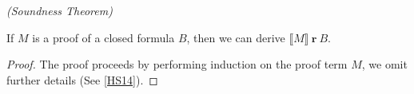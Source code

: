 \begin{mytheorem}
\emph{(Soundness Theorem)}

If $M$ is a proof of a closed formula $B$, then we can derive  $ \llbracket M \rrbracket \ \textbf{r} \ B$.

\begin{proof}

The proof proceeds by performing induction on the proof term $M$, we omit further details (See \ref{HS14}).

\begin{comment}
\begin{description}

\item[Case] $\lambda u^A M^B$ We must derive $$\llbracket \lambda u^A M^B
  \rrbracket \textbf{r} B$$
   \begin{description}
     \item[Subcase] $\tau(A) = \epsilon$ In this case the empty term realises
       A, making the $\lambda u $ redundant, which implies that the extracted
       program from M realises B $$\llbracket \lambda u M \rrbracket
       \textbf{r} (A \to B) = \epsilon \textbf{r} A \to \llbracket M
       \rrbracket \textbf{r} B$$
     \item[Subcase] $\tau(A) \neq \epsilon = \tau (B)$ In this case the
       extracted program is empty $ \llbracket \lambda u M \rrbracket = \epsilon$.

       $$\llbracket \lambda u M \rrbracket \textbf{r} (A \to B) = \forall
       x. x \textbf{r} A \to \epsilon \textbf{r} B$$
     \item[Subcase]$\tau (A) \neq \epsilon \neq \tau (B)$ neither the type of $A$ or $B$ is empty. Therefore if we have an $x$ that
       realises $A$ then this $x$ applied to the extracted program realises B.
         

   \end{description}

\item[Case] $\exists^+_{x,A}$ We now consider the case that an existential
  introduction axiom had been applied in the proof. The axiom takes the
  following form $$\exists^+_{x,A}: \forall^{nc} \vec{\rho} \forall x. A \to
  \exists x A $$
  For our proof of the soundness theorem we need to find a derivation
  of $$\llbracket \exists^+_{x,A} \rrbracket \textbf{r} \forall^{nc}
  \vec{\rho} \forall x.A \to \exists x A$$

  \begin{description}
   

\end{comment}
\end{proof}
\end{mytheorem}
